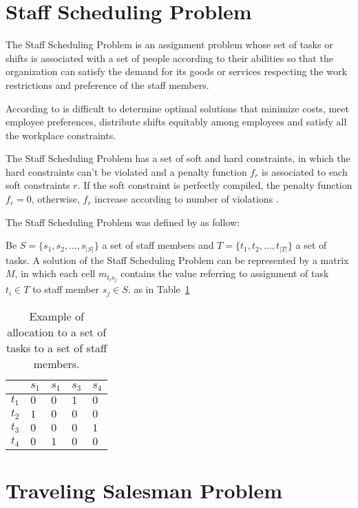 
\section{Staff Scheduling Problem}

The Staff Scheduling Problem is an assignment problem whose set of tasks or shifts is associated with a set of people according to their abilities so that the organization can satisfy the demand for its goods or services respecting the work restrictions and preference of the staff members.

According to  is difficult to determine optimal solutions that minimize costs, meet employee preferences, distribute shifts equitably among employees and satisfy all the workplace constraints.

The Staff Scheduling Problem has a set of soft and hard constraints, in which the hard constraints can't be violated and a penalty function $f_r$ is associated to each soft constraints $r$. If the soft constraint is perfectly compiled, the penalty function $f_r = 0$, otherwise, $f_r$ increase according to number of violations \cite{blochiger:2003}.

The Staff Scheduling Problem was defined by  as follow:

Be $S = \{s_1,s_ 2, \ldots, s_{|S|}\}$ a set of staff members and $T = \{t_1, t_2, \ldots, t_{|T|}\}$ a set of tasks. A solution of the Staff Scheduling Problem can be represented by a matrix $M$, in which each cell $m_{t_is_j}$ contains the value referring to assignment of task $t_i \in T$ to staff member $s_j \in S$. as in Table~\ref{time_table_block}

\begin{table}[h]
\centering
\caption{Example of allocation to a set of tasks to a set of staff members. \label{time_table_block}} 
\begin{tabular}{r|l|l|l|l}
      & $s_1$ & $s_1$ & $s_3$ & $s_4$ \\ \hline
$t_1$ & $0$   & $0$   & $1$   & $0$  \\ \hline
$t_2$ & $1$   & $0$   & $0$   & $0$  \\ \hline
$t_3$ & $0$   & $0$   & $0$   & $1$  \\ \hline
$t_4$ & $0$   & $1$   & $0$   & $0$ 
\end{tabular}
\end{table}


\section{Traveling Salesman Problem}

